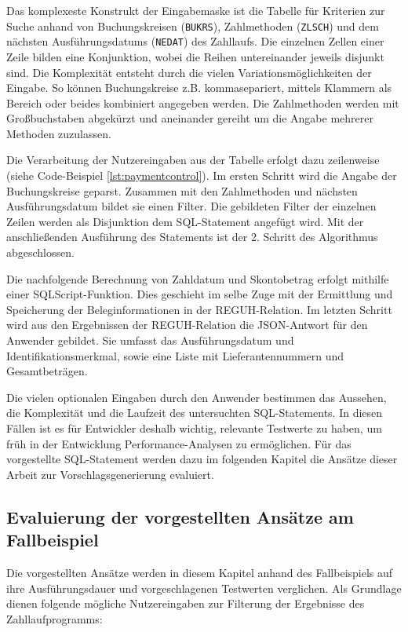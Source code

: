 Das komplexeste Konstrukt der Eingabemaske ist die Tabelle für Kriterien zur Suche anhand von Buchungskreisen (\texttt{BUKRS}), Zahlmethoden (\texttt{ZLSCH}) und dem nächsten Ausführungsdatums (\texttt{NEDAT}) des Zahllaufs.
Die einzelnen Zellen einer Zeile bilden eine Konjunktion, wobei die Reihen untereinander jeweils disjunkt sind.
Die Komplexität entsteht durch die vielen Variationsmöglichkeiten der Eingabe.
So können Buchungskreise z.B. kommasepariert, mittels Klammern als Bereich oder beides kombiniert angegeben werden.
Die Zahlmethoden werden mit Großbuchstaben abgekürzt und aneinander gereiht um die Angabe mehrerer Methoden zuzulassen.

Die Verarbeitung der Nutzereingaben aus der Tabelle erfolgt dazu zeilenweise (siehe Code-Beispiel \ref{lst:paymentcontrol}).
Im ersten Schritt wird die Angabe der Buchungskreise geparst.
Zusammen mit den Zahlmethoden und nächsten Ausführungsdatum bildet sie einen Filter.
Die gebildeten Filter der einzelnen Zeilen werden als Disjunktion dem SQL-Statement angefügt wird.
Mit der anschließenden Ausführung des Statements ist der 2. Schritt des Algorithmus abgeschlossen.

Die nachfolgende Berechnung von Zahldatum und Skontobetrag erfolgt mithilfe einer SQLScript-Funktion.
Dies geschieht im selbe Zuge mit der Ermittlung und Speicherung der Beleginformationen in der REGUH-Relation.
Im letzten Schritt wird aus den Ergebnissen der REGUH-Relation die JSON-Antwort für den Anwender gebildet.
Sie umfasst das Ausführungsdatum und Identifikationsmerkmal, sowie eine Liste mit Lieferantennummern und Gesamtbeträgen.

Die vielen optionalen Eingaben durch den Anwender bestimmen das Aussehen, die Komplexität und die Laufzeit des untersuchten SQL-Statements.
In diesen Fällen ist es für Entwickler deshalb wichtig, relevante Testwerte zu haben, um früh in der Entwicklung Performance-Analysen zu ermöglichen.
Für das vorgestellte SQL-Statement werden dazu im folgenden Kapitel die Ansätze dieser Arbeit zur Vorschlagsgenerierung evaluiert.

\subsection{Evaluierung der vorgestellten Ansätze am Fallbeispiel}
Die vorgestellten Ansätze werden in diesem Kapitel anhand des Fallbeispiels auf ihre Ausführungsdauer und vorgeschlagenen Testwerten verglichen.
Als Grundlage dienen folgende mögliche Nutzereingaben zur Filterung der Ergebnisse des Zahllaufprogramms:


